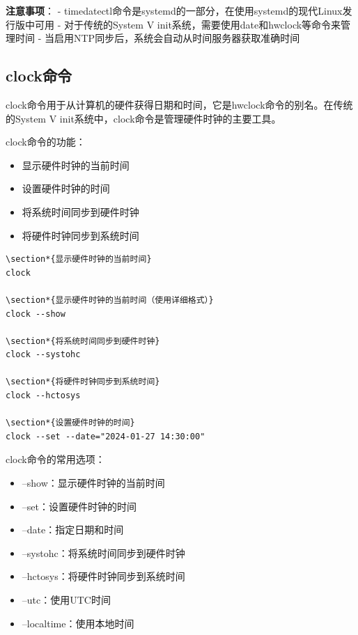 \documentclass[12pt,UTF8]{ctexbook}
\begin{document}
\textbf{注意事项}：
- timedatectl命令是systemd的一部分，在使用systemd的现代Linux发行版中可用
- 对于传统的System V init系统，需要使用date和hwclock等命令来管理时间
- 当启用NTP同步后，系统会自动从时间服务器获取准确时间

\subsection{clock命令}
clock命令用于从计算机的硬件获得日期和时间，它是hwclock命令的别名。在传统的System V init系统中，clock命令是管理硬件时钟的主要工具。

clock命令的功能：
\begin{itemize}
    \item 显示硬件时钟的当前时间
    \item 设置硬件时钟的时间
    \item 将系统时间同步到硬件时钟
    \item 将硬件时钟同步到系统时间
\end{itemize}

\begin{verbatim}
\section*{显示硬件时钟的当前时间}
clock

\section*{显示硬件时钟的当前时间（使用详细格式）}
clock --show

\section*{将系统时间同步到硬件时钟}
clock --systohc

\section*{将硬件时钟同步到系统时间}
clock --hctosys

\section*{设置硬件时钟的时间}
clock --set --date="2024-01-27 14:30:00"
\end{verbatim}

clock命令的常用选项：
\begin{itemize}
    \item --show：显示硬件时钟的当前时间
    \item --set：设置硬件时钟的时间
    \item --date：指定日期和时间
    \item --systohc：将系统时间同步到硬件时钟
    \item --hctosys：将硬件时钟同步到系统时间
    \item --utc：使用UTC时间
    \item --localtime：使用本地时间
\end{itemize}
\end{document}
